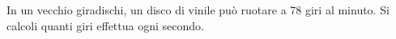 In un vecchio giradischi, un disco di vinile può ruotare a 78 giri al minuto. 
Si calcoli quanti giri effettua ogni secondo.
